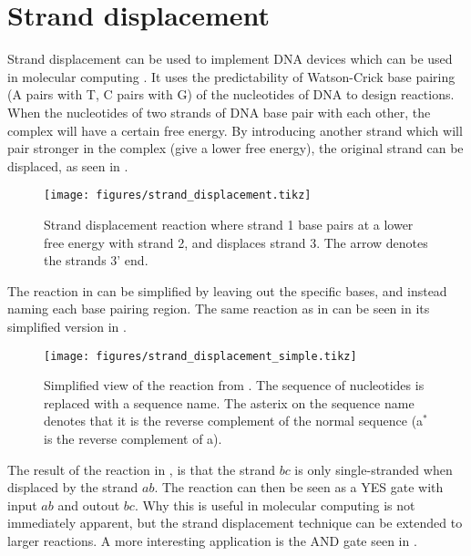 \section{Strand displacement}

Strand displacement can be used to implement DNA devices which can be used in molecular computing \cite{Zhang2011}. It uses the predictability of Watson-Crick base pairing (A pairs with T, C pairs with G) of the nucleotides of DNA to design reactions. When the nucleotides of two strands of DNA base pair with each other, the complex will have a certain free energy. By introducing another strand which will pair stronger in the complex (give a lower free energy), the original strand can be displaced, as seen in .

\begin{figure}[H]
\centering
\texttt{[image: figures/strand\_displacement.tikz]}
\caption{Strand displacement reaction where strand 1 base pairs at a lower free energy with strand 2, and displaces strand 3. The arrow denotes the strands 3' end.}
\label{strand_displacement}
\end{figure}

The reaction in  can be simplified by leaving out the specific bases, and instead naming each base pairing region. The same reaction as in  can be seen in its simplified version in .

\begin{figure}[H]
\centering
\texttt{[image: figures/strand\_displacement\_simple.tikz]}
\caption{Simplified view of the reaction from . The sequence of nucleotides is replaced with a sequence name. The asterix on the sequence name denotes that it is the reverse complement of the normal sequence (a$^*$ is the reverse complement of a).}
\label{strand_displacement_simple}
\end{figure}

The result of the reaction in , is that the strand $bc$ is only single-stranded when displaced by the strand $ab$. The reaction can then be seen as a YES gate with input $ab$ and outout $bc$. Why this is useful in molecular computing is not immediately apparent, but the strand displacement technique can be extended to larger reactions. A more interesting application is the AND gate seen in .

